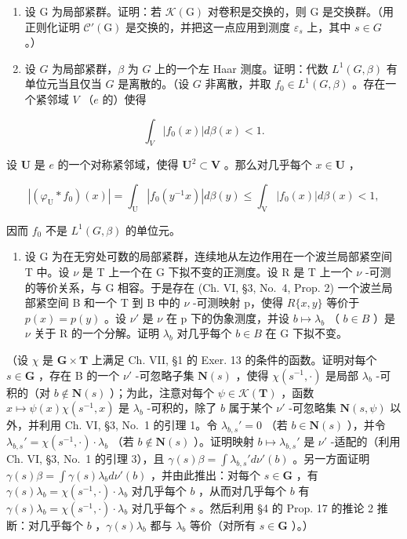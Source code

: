 \begin{enumerate}
\def\labelenumi{\arabic{enumi})}
\setcounter{enumi}{5}
\item
  设 G 为局部紧群。证明：若 \(\mathcal{K}(\mathrm{G})\) 对卷积是交换的，则 G 是交换群。（用正则化证明 \(\mathcal{C}'(\mathrm{G})\) 是交换的，并把这一点应用到测度 \(\varepsilon_{s}\) 上，其中 \(s \in G\) 。）
\item
  设 \(G\) 为局部紧群，\(\beta\) 为 \(G\) 上的一个左 Haar 测度。证明：代数 \(L^1(G, \beta)\) 有单位元当且仅当 \(G\) 是离散的。（设 \(G\) 非离散，并取 \(f_0 \in L^1(G, \beta)\) 。存在一个紧邻域 \(V\) （\(e\) 的）使得
\end{enumerate}

\[
\int_ {V} | f _ {0} (x) | d \beta (x) <   1.
\]

设 \(\mathbf{U}\) 是 \(e\) 的一个对称紧邻域，使得 \(\mathbf{U}^2 \subset \mathbf{V}\) 。那么对几乎每个 \(x \in \mathbf{U}\) ，

\[
\left| \left(\varphi_ {\mathrm{U}} * f _ {0}\right) (x) \right| = \int_ {\mathrm{U}} \left| f _ {0} \left(y ^ {- 1} x\right) \right| d \beta (y) \leqslant \int_ {\mathrm{V}} \left| f _ {0} (x) \right| d \beta (x) <   1,
\]

因而 \(f_0\) 不是 \(L^1(G, \beta)\) 的单位元。

\begin{enumerate}
\def\labelenumi{\arabic{enumi})}
\setcounter{enumi}{7}
\tightlist
\item
  设 G 为在无穷处可数的局部紧群，连续地从左边作用在一个波兰局部紧空间 T 中。设 \(\nu\) 是 T 上一个在 G 下拟不变的正测度。设 R 是 T 上一个 \(\nu\) -可测的等价关系，与 G 相容。于是存在 (Ch. VI, §3, No.~4, Prop. 2) 一个波兰局部紧空间 B 和一个 T 到 B 中的 \(\nu\) -可测映射 p，使得 \(R\{x,y\}\) 等价于 \(p(x)=p(y)\) 。设 \(\nu'\) 是 \(\nu\) 在 p 下的伪象测度，并设 \(b\mapsto\lambda_{b}\) （ \(b\in B\) ）是 \(\nu\) 关于 R 的一个分解。证明 \(\lambda_{b}\) 对几乎每个 \(b\in B\) 在 G 下拟不变。
\end{enumerate}

（设 \(\chi\) 是 \(\mathbf{G} \times \mathbf{T}\) 上满足 Ch. VII, §1 的 Exer. 13 的条件的函数。证明对每个 \(s \in \mathbf{G}\) ，存在 B 的一个 \(\nu'\) -可忽略子集 \(\mathbf{N}(s)\) ，使得 \(\chi(s^{-1}, \cdot)\) 是局部 \(\lambda_b\) -可积的（对 \(b \notin \mathbf{N}(s)\) ）；为此，注意对每个 \(\psi \in \mathcal{K}(\mathbf{T})\) ，函数 \(x \mapsto \psi(x)\chi(s^{-1}, x)\) 是 \(\lambda_b\) -可积的，除了 \(b\) 属于某个 \(\nu'\) -可忽略集 \(\mathbf{N}(s, \psi)\) 以外，并利用 Ch. VI, §3, No.~1 的引理 1。令 \(\lambda_{b,s}' = 0\) （若 \(b \in \mathbf{N}(s)\) ），并令 \(\lambda_{b,s}' = \chi(s^{-1}, \cdot) \cdot \lambda_b\) （若 \(b \notin \mathbf{N}(s)\) ）。证明映射 \(b \mapsto \lambda_{b,s}'\) 是 \(\nu'\) -适配的（利用 Ch. VI, §3, No.~1 的引理 3），且 \(\gamma(s)\beta = \int \lambda_{b,s}' d\nu'(b)\) 。另一方面证明 \(\gamma(s)\beta = \int \gamma(s)\lambda_b d\nu'(b)\) ，并由此推出：对每个 \(s \in \mathbf{G}\) ，有 \(\gamma(s)\lambda_b = \chi(s^{-1}, \cdot) \cdot \lambda_b\) 对几乎每个 \(b\) ，从而对几乎每个 \(b\) 有 \(\gamma(s)\lambda_b = \chi(s^{-1}, \cdot) \cdot \lambda_b\) 对几乎每个 \(s\) 。然后利用 §4 的 Prop. 17 的推论 2 推断：对几乎每个 \(b\) ，\(\gamma(s)\lambda_b\) 都与 \(\lambda_b\) 等价（对所有 \(s \in \mathbf{G}\) ）。）

